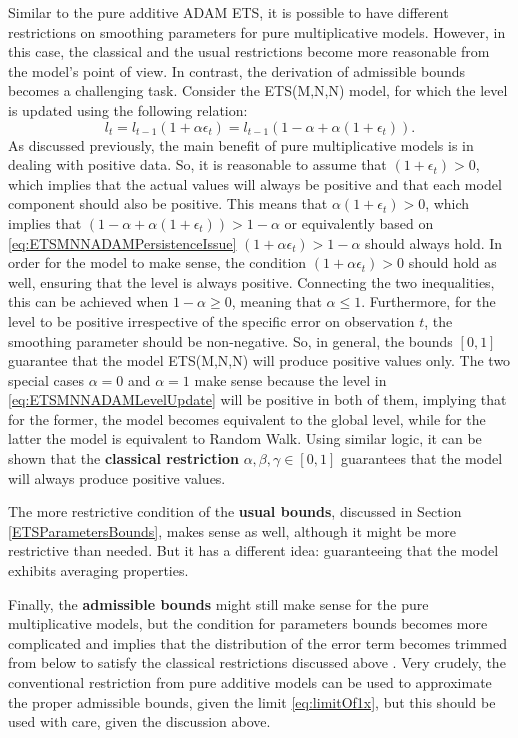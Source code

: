 \documentclass[
]{book}
\theoremstyle{definition}
\theoremstyle{definition}
\theoremstyle{definition}
\theoremstyle{definition}
\theoremstyle{remark}
\begin{document}
Similar to the pure additive ADAM ETS, it is possible to have different restrictions on smoothing parameters for pure multiplicative models. However, in this case, the classical and the usual restrictions become more reasonable from the model's point of view. In contrast, the derivation of admissible bounds becomes a challenging task. Consider the ETS(M,N,N) model, for which the level is updated using the following relation:
\begin{equation}
    l_t = l_{t-1} (1 + \alpha\epsilon_t) = l_{t-1} (1-\alpha + \alpha(1+\epsilon_t)).
  \label{eq:ETSMNNADAMLevelUpdate}
\end{equation}
As discussed previously, the main benefit of pure multiplicative models is in dealing with positive data. So, it is reasonable to assume that \((1 + \epsilon_t)>0\), which implies that the actual values will always be positive and that each model component should also be positive. This means that \(\alpha(1 + \epsilon_t)>0\), which implies that \((1-\alpha + \alpha(1+\epsilon_t))>1-\alpha\) or equivalently based on \eqref{eq:ETSMNNADAMPersistenceIssue} \((1 + \alpha\epsilon_t)>1-\alpha\) should always hold. In order for the model to make sense, the condition \((1 + \alpha\epsilon_t)>0\) should hold as well, ensuring that the level is always positive. Connecting the two inequalities, this can be achieved when \(1-\alpha \geq 0\), meaning that \(\alpha \leq 1\). Furthermore, for the level to be positive irrespective of the specific error on observation \(t\), the smoothing parameter should be non-negative. So, in general, the bounds \([0, 1]\) guarantee that the model ETS(M,N,N) will produce positive values only. The two special cases \(\alpha=0\) and \(\alpha=1\) make sense because the level in \eqref{eq:ETSMNNADAMLevelUpdate} will be positive in both of them, implying that for the former, the model becomes equivalent to the global level, while for the latter the model is equivalent to Random Walk. Using similar logic, it can be shown that the \textbf{classical restriction} \(\alpha, \beta, \gamma \in [0, 1]\) guarantees that the model will always produce positive values.

The more restrictive condition of the \textbf{usual bounds}, discussed in Section \ref{ETSParametersBounds}, makes sense as well, although it might be more restrictive than needed. But it has a different idea: guaranteeing that the model exhibits averaging properties.

Finally, the \textbf{admissible bounds} might still make sense for the pure multiplicative models, but the condition for parameters bounds becomes more complicated and implies that the distribution of the error term becomes trimmed from below to satisfy the classical restrictions discussed above \citep[see, for example, discussion in][]{Akram2009}. Very crudely, the conventional restriction from pure additive models can be used to approximate the proper admissible bounds, given the limit \eqref{eq:limitOf1x}, but this should be used with care, given the discussion above.
\end{document}
